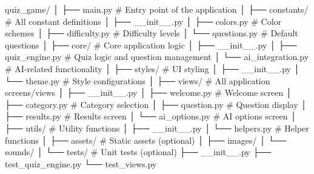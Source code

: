 quiz_game/
│
├── main.py                # Entry point of the application
│
├── constants/             # All constant definitions
│   ├── __init__.py
│   ├── colors.py          # Color schemes
│   ├── difficulty.py      # Difficulty levels
│   └── questions.py       # Default questions
│
├── core/                  # Core application logic
│   ├── __init__.py
│   ├── quiz_engine.py     # Quiz logic and question management
│   └── ai_integration.py  # AI-related functionality
│
├── styles/                # UI styling
│   ├── __init__.py
│   └── theme.py          # Style configurations
│
├── views/                 # All application screens/views
│   ├── __init__.py
│   ├── welcome.py        # Welcome screen
│   ├── category.py       # Category selection
│   ├── question.py       # Question display
│   ├── results.py        # Results screen
│   └── ai_options.py     # AI options screen
│
├── utils/                 # Utility functions
│   ├── __init__.py
│   └── helpers.py        # Helper functions
│
├── assets/                # Static assets (optional)
│   ├── images/
│   └── sounds/
│
└── tests/                 # Unit tests (optional)
    ├── __init__.py
    ├── test_quiz_engine.py
    └── test_views.py
